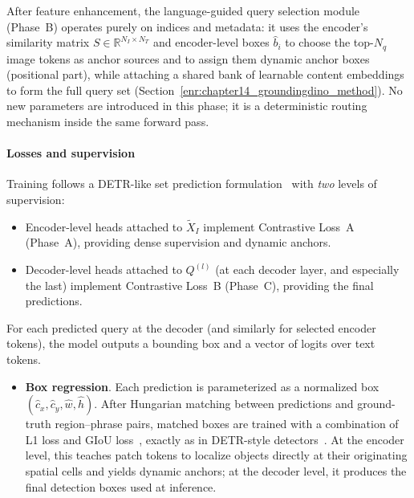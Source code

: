 \begin{enrichment}
\begin{enrichment}
		After feature enhancement, the language-guided query selection module (Phase~B) operates purely on indices and metadata: it uses the encoder’s similarity matrix \(S \in \mathbb{R}^{N_I \times N_T}\) and encoder-level boxes \(\hat{b}_i\) to choose the top-\(N_q\) image tokens as anchor sources and to assign them dynamic anchor boxes (positional part), while attaching a shared bank of learnable content embeddings to form the full query set (Section~\ref{enr:chapter14_groundingdino_method}). No new parameters are introduced in this phase; it is a deterministic routing mechanism inside the same forward pass.
		
		\paragraph{Losses and supervision}
		
		Training follows a DETR-like set prediction formulation~\cite{carion2020_detr,zhang2022_dino} with \emph{two} levels of supervision:
		\begin{itemize}
			\item Encoder-level heads attached to \(\tilde{X}_I\) implement Contrastive Loss~A (Phase~A), providing dense supervision and dynamic anchors.
			\item Decoder-level heads attached to \(Q^{(l)}\) (at each decoder layer, and especially the last) implement Contrastive Loss~B (Phase~C), providing the final predictions.
		\end{itemize}
		For each predicted query at the decoder (and similarly for selected encoder tokens), the model outputs a bounding box and a vector of logits over text tokens.
		
		\newpage
		
		\begin{itemize}
			\item \textbf{Box regression}.  
			Each prediction is parameterized as a normalized box \((\hat{c}_x,\hat{c}_y,\hat{w},\hat{h})\). After Hungarian matching between predictions and ground-truth region–phrase pairs, matched boxes are trained with a combination of L1 loss and GIoU loss~\cite{rezatofighi2019_giou}, exactly as in DETR-style detectors~\cite{carion2020_detr,zhang2022_dino}. At the encoder level, this teaches patch tokens to localize objects directly at their originating spatial cells and yields dynamic anchors; at the decoder level, it produces the final detection boxes used at inference.
			

\end{itemize}
\end{enrichment}
\end{enrichment}
